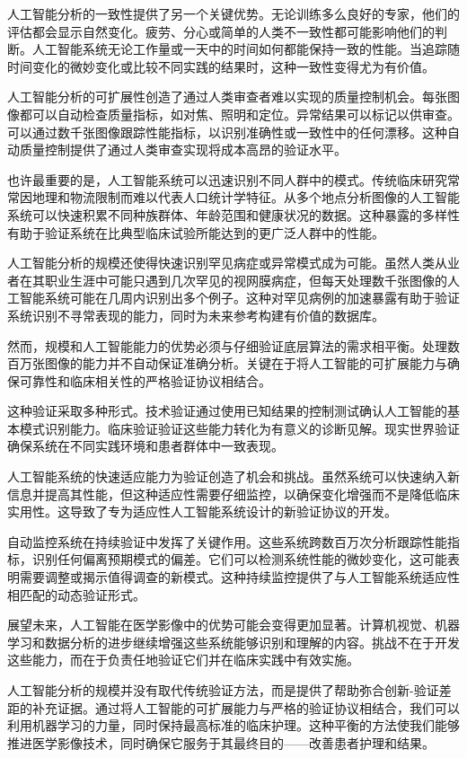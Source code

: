 \documentclass[
  Letterpaper,
]{scrbook}
\begin{document}
人工智能分析的一致性提供了另一个关键优势。无论训练多么良好的专家，他们的评估都会显示自然变化。疲劳、分心或简单的人类不一致性都可能影响他们的判断。人工智能系统无论工作量或一天中的时间如何都能保持一致的性能。当追踪随时间变化的微妙变化或比较不同实践的结果时，这种一致性变得尤为有价值。

人工智能分析的可扩展性创造了通过人类审查者难以实现的质量控制机会。每张图像都可以自动检查质量指标，如对焦、照明和定位。异常结果可以标记以供审查。可以通过数千张图像跟踪性能指标，以识别准确性或一致性中的任何漂移。这种自动质量控制提供了通过人类审查实现将成本高昂的验证水平。

也许最重要的是，人工智能系统可以迅速识别不同人群中的模式。传统临床研究常常因地理和物流限制而难以代表人口统计学特征。从多个地点分析图像的人工智能系统可以快速积累不同种族群体、年龄范围和健康状况的数据。这种暴露的多样性有助于验证系统在比典型临床试验所能达到的更广泛人群中的性能。

人工智能分析的规模还使得快速识别罕见病症或异常模式成为可能。虽然人类从业者在其职业生涯中可能只遇到几次罕见的视网膜病症，但每天处理数千张图像的人工智能系统可能在几周内识别出多个例子。这种对罕见病例的加速暴露有助于验证系统识别不寻常表现的能力，同时为未来参考构建有价值的数据库。

然而，规模和人工智能能力的优势必须与仔细验证底层算法的需求相平衡。处理数百万张图像的能力并不自动保证准确分析。关键在于将人工智能的可扩展能力与确保可靠性和临床相关性的严格验证协议相结合。

这种验证采取多种形式。技术验证通过使用已知结果的控制测试确认人工智能的基本模式识别能力。临床验证验证这些能力转化为有意义的诊断见解。现实世界验证确保系统在不同实践环境和患者群体中一致表现。

人工智能系统的快速适应能力为验证创造了机会和挑战。虽然系统可以快速纳入新信息并提高其性能，但这种适应性需要仔细监控，以确保变化增强而不是降低临床实用性。这导致了专为适应性人工智能系统设计的新验证协议的开发。

自动监控系统在持续验证中发挥了关键作用。这些系统跨数百万次分析跟踪性能指标，识别任何偏离预期模式的偏差。它们可以检测系统性能的微妙变化，这可能表明需要调整或揭示值得调查的新模式。这种持续监控提供了与人工智能系统适应性相匹配的动态验证形式。

展望未来，人工智能在医学影像中的优势可能会变得更加显著。计算机视觉、机器学习和数据分析的进步继续增强这些系统能够识别和理解的内容。挑战不在于开发这些能力，而在于负责任地验证它们并在临床实践中有效实施。

人工智能分析的规模并没有取代传统验证方法，而是提供了帮助弥合创新-验证差距的补充证据。通过将人工智能的可扩展能力与严格的验证协议相结合，我们可以利用机器学习的力量，同时保持最高标准的临床护理。这种平衡的方法使我们能够推进医学影像技术，同时确保它服务于其最终目的------改善患者护理和结果。
\end{document}
